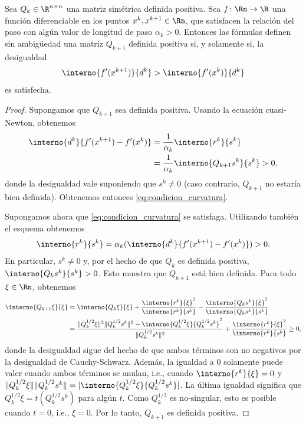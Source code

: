 \begin{proposition}\label{prop:dfp_pos_def}
    Sea $Q_k \in \R^{n \times n}$ una matriz simétrica definida positiva. Sea $f \colon \Rn \to \R$ una función diferenciable en los puntos $x^k, x^{k+1} \in \Rn$, que satisfacen la relación del paso con algún valor de longitud de paso $\alpha_k > 0$.
    Entonces las fórmulas definen sin ambigüedad una matriz $Q_{k+1}$ definida positiva si, y solamente si, la desigualdad
    \begin{equation}
        \interno{f'(x^{k+1})}{d^k} > \interno{f'(x^k)}{d^k}
        \label{eq:condicion_curvatura}
    \end{equation}
    es satisfecha.
\end{proposition}

\begin{proof}
    Supongamos que $Q_{k+1}$ sea definida positiva. Usando la ecuación cuasi-Newton, obtenemos
    \begin{align*}
        \interno{d^k}{f'(x^{k+1}) - f'(x^k)} &= \frac{1}{\alpha_k} \interno{r^k}{s^k} \\
        &= \frac{1}{\alpha_k} \interno{Q_{k+1} s^k}{s^k} > 0,
    \end{align*}
    donde la desigualdad vale suponiendo que $s^k \neq 0$ (caso contrario, $Q_{k+1}$ no estaría bien definida). Obtenemos entonces \eqref{eq:condicion_curvatura}.
    
    Supongamos ahora que \eqref{eq:condicion_curvatura} se satisfaga. Utilizando también el esquema obtenemos
    \[
        \interno{r^k}{s^k} = \alpha_k (\interno{d^k}{f'(x^{k+1}) - f'(x^k)}) > 0.
    \]
    En particular, $s^k \neq 0$ y, por el hecho de que $Q_k$ es definida positiva, $\interno{Q_k s^k}{s^k} > 0$. Esto muestra que $Q_{k+1}$ está bien definida. Para todo $\xi \in \Rn$, obtenemos
    \begin{align*}
        \interno{Q_{k+1}\xi}{\xi} &= \interno{Q_k \xi}{\xi} + \frac{\interno{r^k}{\xi}^2}{\interno{r^k}{s^k}} - \frac{\interno{Q_k s^k}{\xi}^2}{\interno{Q_k s^k}{s^k}} \\
        &= \frac{\|Q_k^{1/2} \xi\|^2 \|Q_k^{1/2} s^k\|^2 - \interno{Q_k^{1/2} \xi}{Q_k^{1/2} s^k}^2}{\|Q_k^{1/2} s^k\|^2} + \frac{\interno{r^k}{\xi}^2}{\interno{r^k}{s^k}} \ge 0,
    \end{align*}
    donde la desigualdad sigue del hecho de que ambos términos son no negativos por la desigualdad de Cauchy-Schwarz. Además, la igualdad a $0$ solamente puede valer cuando ambos términos se anulan, i.e., cuando $\interno{r^k}{\xi} = 0$ y $\|Q_k^{1/2} \xi\| \|Q_k^{1/2} s^k\| = |\interno{Q_k^{1/2} \xi}{Q_k^{1/2} s^k}|$. La última igualdad significa que $Q_k^{1/2} \xi = t (Q_k^{1/2} s^k)$ para algún $t$. Como $Q_k^{1/2}$ es no-singular, esto es posible cuando $t = 0$, i.e., $\xi = 0$. Por lo tanto, $Q_{k+1}$ es definida positiva.
\end{proof}

